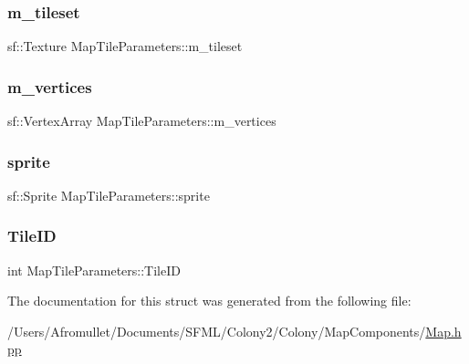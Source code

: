 \subsubsection{\texorpdfstring{m\+\_\+tileset}{m\_tileset}}
{\footnotesize\ttfamily sf\+::\+Texture Map\+Tile\+Parameters\+::m\+\_\+tileset}

\mbox{\label{struct_map_tile_parameters_a37a456acd1110b590bc254bb3d193d11}} 
\subsubsection{\texorpdfstring{m\+\_\+vertices}{m\_vertices}}
{\footnotesize\ttfamily sf\+::\+Vertex\+Array Map\+Tile\+Parameters\+::m\+\_\+vertices}

\mbox{\label{struct_map_tile_parameters_a9a36e686aa0e4a3d3fa5f299b8667b0d}} 
\subsubsection{\texorpdfstring{sprite}{sprite}}
{\footnotesize\ttfamily sf\+::\+Sprite Map\+Tile\+Parameters\+::sprite}

\mbox{\label{struct_map_tile_parameters_ac660182507cc13ce6c421b37b5dd4039}} 
\subsubsection{\texorpdfstring{Tile\+ID}{TileID}}
{\footnotesize\ttfamily int Map\+Tile\+Parameters\+::\+Tile\+ID}



The documentation for this struct was generated from the following file\+:\begin{DoxyCompactItemize}
\item 
/\+Users/\+Afromullet/\+Documents/\+S\+F\+M\+L/\+Colony2/\+Colony/\+Map\+Components/\mbox{\hyperlink{_map_8hpp}{Map.\+hpp}}\end{DoxyCompactItemize}
